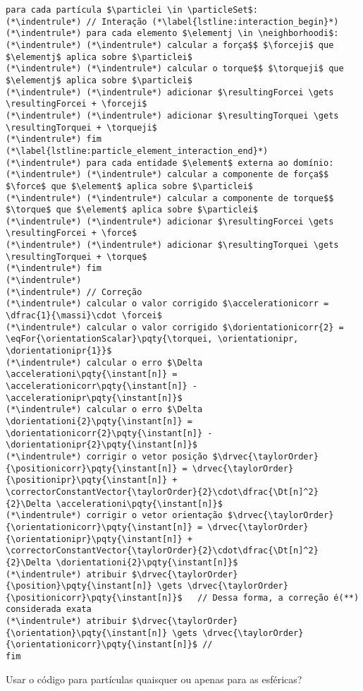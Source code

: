 \begin{lstlisting}[float, floatplacement=h, language=pseudocode, label=lst:equations_solution, caption=Pseudocódigo para a solução das equações de movimento por meio do algoritmo de Gear.]
para cada partícula $\particlei \in \particleSet$:
(*\indentrule*)	// Interação (*\label{lstline:interaction_begin}*)
(*\indentrule*)	para cada elemento $\elementj \in \neighborhoodi$:
(*\indentrule*)	(*\indentrule*)	calcular a força$$ $\forceji$ que $\elementj$ aplica sobre $\particlei$
(*\indentrule*)	(*\indentrule*)	calcular o torque$$ $\torqueji$ que $\elementj$ aplica sobre $\particlei$
(*\indentrule*)	(*\indentrule*)	adicionar $\resultingForcei \gets \resultingForcei + \forceji$
(*\indentrule*)	(*\indentrule*)	adicionar $\resultingTorquei \gets \resultingTorquei + \torqueji$
(*\indentrule*)	fim (*\label{lstline:particle_element_interaction_end}*)
(*\indentrule*)	para cada entidade $\element$ externa ao domínio:
(*\indentrule*)	(*\indentrule*)	calcular a componente de força$$ $\force$ que $\element$ aplica sobre $\particlei$
(*\indentrule*)	(*\indentrule*)	calcular a componente de torque$$ $\torque$ que $\element$ aplica sobre $\particlei$
(*\indentrule*)	(*\indentrule*)	adicionar $\resultingForcei \gets \resultingForcei + \force$
(*\indentrule*)	(*\indentrule*)	adicionar $\resultingTorquei \gets \resultingTorquei + \torque$
(*\indentrule*)	fim
(*\indentrule*)
(*\indentrule*)	// Correção
(*\indentrule*)	calcular o valor corrigido $\accelerationicorr =  \dfrac{1}{\massi}\cdot \forcei$
(*\indentrule*)	calcular o valor corrigido $\dorientationicorr{2} = \eqFor{\orientationScalar}\pqty{\torquei, \orientationipr, \dorientationipr{1}}$
(*\indentrule*)	calcular o erro $\Delta \accelerationi\pqty{\instant[n]} = \accelerationicorr\pqty{\instant[n]} - \accelerationipr\pqty{\instant[n]}$
(*\indentrule*)	calcular o erro $\Delta \dorientationi{2}\pqty{\instant[n]} = \dorientationicorr{2}\pqty{\instant[n]} - \dorientationipr{2}\pqty{\instant[n]}$
(*\indentrule*)	corrigir o vetor posição $\drvec{\taylorOrder}{\positionicorr}\pqty{\instant[n]} = \drvec{\taylorOrder}{\positionipr}\pqty{\instant[n]} + \correctorConstantVector{\taylorOrder}{2}\cdot\dfrac{\Dt[n]^2}{2}\Delta \accelerationi\pqty{\instant[n]}$
(*\indentrule*)	corrigir o vetor orientação $\drvec{\taylorOrder}{\orientationicorr}\pqty{\instant[n]} = \drvec{\taylorOrder}{\orientationipr}\pqty{\instant[n]} + \correctorConstantVector{\taylorOrder}{2}\cdot\dfrac{\Dt[n]^2}{2}\Delta \dorientationi{2}\pqty{\instant[n]}$
(*\indentrule*)	atribuir $\drvec{\taylorOrder}{\position}\pqty{\instant[n]} \gets \drvec{\taylorOrder}{\positionicorr}\pqty{\instant[n]}$	// Dessa forma, a correção é(**) considerada exata
(*\indentrule*)	atribuir $\drvec{\taylorOrder}{\orientation}\pqty{\instant[n]} \gets \drvec{\taylorOrder}{\orientationicorr}\pqty{\instant[n]}$	//		
fim
\end{lstlisting}
\alert{Usar o código para partículas quaisquer ou apenas para as esféricas?}

